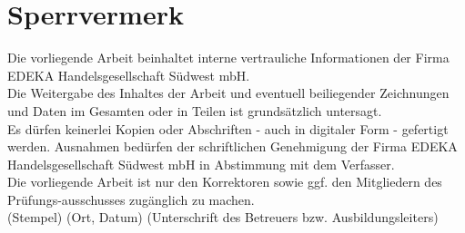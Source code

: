 \chapter*{Sperrvermerk}
Die vorliegende Arbeit beinhaltet interne vertrauliche Informationen 
der Firma EDEKA Handelsgesellschaft Südwest mbH.\\ 

\noindent Die Weitergabe des Inhaltes der Arbeit und eventuell beiliegender Zeichnungen und Daten im Gesamten oder in Teilen ist grundsätzlich untersagt.\\ 

\noindent Es dürfen keinerlei Kopien oder Abschriften - auch in digitaler Form - gefertigt werden. Ausnahmen bedürfen der schriftlichen Genehmigung der Firma EDEKA Handelsgesellschaft Südwest mbH in Abstimmung mit dem Verfasser.\\

\noindent Die vorliegende Arbeit ist nur den Korrektoren sowie ggf. den Mitgliedern des Prüfungs-ausschusses zugänglich zu machen. \\

\vspace*{2cm}
\noindent(Stempel)
\vspace*{1.5cm}\newline
\noindent(Ort, Datum)
\vspace*{1cm}\newline
\noindent(Unterschrift des Betreuers bzw. Ausbildungsleiters)
